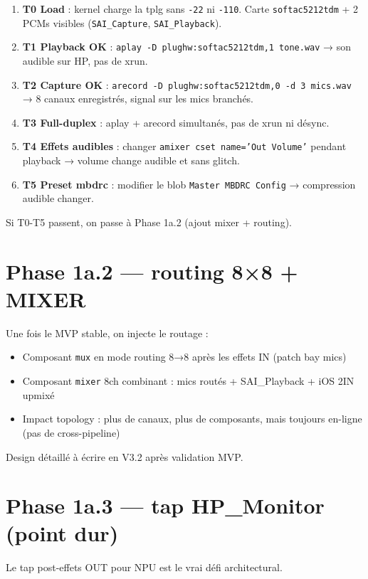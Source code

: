 \documentclass[11pt,a4paper]{article}
\begin{document}
\begin{enumerate}[leftmargin=*, itemsep=2pt]
  \item \textbf{T0 Load} : kernel charge la tplg sans \texttt{-22} ni \texttt{-110}. Carte \texttt{softac5212tdm} + 2 PCMs visibles (\texttt{SAI\_Capture}, \texttt{SAI\_Playback}).
  \item \textbf{T1 Playback OK} : \texttt{aplay -D plughw:softac5212tdm,1 tone.wav} → son audible sur HP, pas de xrun.
  \item \textbf{T2 Capture OK} : \texttt{arecord -D plughw:softac5212tdm,0 -d 3 mics.wav} → 8 canaux enregistrés, signal sur les mics branchés.
  \item \textbf{T3 Full-duplex} : aplay + arecord simultanés, pas de xrun ni désync.
  \item \textbf{T4 Effets audibles} : changer \texttt{amixer cset name='Out Volume'} pendant playback → volume change audible et sans glitch.
  \item \textbf{T5 Preset mbdrc} : modifier le blob \texttt{Master MBDRC Config} → compression audible changer.
\end{enumerate}

Si T0-T5 passent, on passe à Phase 1a.2 (ajout mixer + routing).

\section{Phase 1a.2 --- routing 8×8 + MIXER}

Une fois le MVP stable, on injecte le routage :

\begin{itemize}[leftmargin=*, itemsep=1pt]
  \item Composant \texttt{mux} en mode routing 8→8 après les effets IN (patch bay mics)
  \item Composant \texttt{mixer} 8ch combinant : mics routés + SAI\_Playback + iOS 2IN upmixé
  \item Impact topology : plus de canaux, plus de composants, mais toujours en-ligne (pas de cross-pipeline)
\end{itemize}

Design détaillé à écrire en V3.2 après validation MVP.

\section{Phase 1a.3 --- tap HP\_Monitor (point dur)}

Le tap post-effets OUT pour NPU est le vrai défi architectural.
\end{document}
